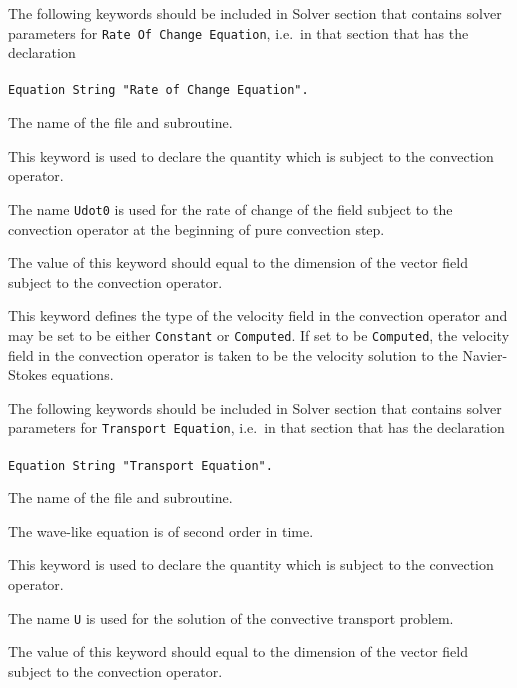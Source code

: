 \begin{versiona}

The following keywords should be included in Solver section that contains
solver parameters for {\tt Rate Of Change Equation}, i.e.\ in that  
section that has the declaration \\ \\
{\tt Equation String "Rate of Change Equation".}

\sifbegin
{} 
The name of the file and subroutine.

This keyword is used to declare the quantity which is subject to the convection
operator.

The name {\tt Udot0} is used for the rate of change of the field 
subject to the convection operator at the beginning of pure convection step.  

The value of this keyword should equal to the dimension of the vector field 
subject to the convection operator.
 
This keyword defines the type of the velocity field in the convection operator
and may be set to be either {\tt Constant} or {\tt Computed}. 
If set to be {\tt Computed}, the velocity field in the convection 
operator is taken to be the velocity solution to the Navier-Stokes equations.
\sifend


The following keywords should be included in Solver section that contains
solver parameters for {\tt Transport Equation}, i.e.\ in that  
section that has the declaration \\ \\
{\tt Equation String "Transport Equation".}

\sifbegin
{} 
The name of the file and subroutine.

The wave-like equation is of second order in time.

This keyword is used to declare the quantity which is subject to the 
convection operator. 

The name {\tt U} is used for the solution of the convective transport problem.
  
The value of this keyword should equal to the dimension of the vector field 
subject to the convection operator.


\end{versiona}
